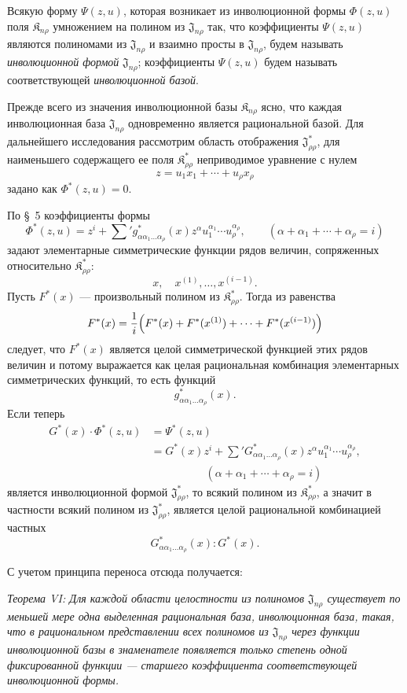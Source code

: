 \documentclass[11pt]{article}
\providecommand{\Kfield}{\mathfrak{K}}
\providecommand{\Jdom}{\mathfrak{J}}
\begin{document}
Всякую форму $\Psi(z,u)$, которая возникает из инволюционной формы $\Phi(z,u)$ поля $\Kfield_{n\rho}$ умножением на полином из $\Jdom_{n\rho}$ так, что коэффициенты $\Psi(z,u)$ являются полиномами из $\Jdom_{n\rho}$ и взаимно просты в $\Jdom_{n\rho}$, будем называть \emph{инволюционной формой} $\Jdom_{n\rho}$; коэффициенты $\Psi(z,u)$ будем называть соответствующей \emph{инволюционной базой}.

Прежде всего из значения инволюционной базы $\Kfield_{n\rho}$ ясно, что каждая инволюционная база $\Jdom_{n\rho}$ одновременно является рациональной базой. Для дальнейшего исследования рассмотрим область отображения $\Jdom^*_{\rho\rho}$, для наименьшего содержащего ее поля $\Kfield^*_{\rho\rho}$ неприводимое уравнение с нулем
\[
  z=u_1x_1+\cdots+u_\rho x_\rho
\]
задано как $\Phi^*(z,u)=0$.

По \S\ 5 коэффициенты формы
\[
  \Phi^*(z,u)=z^i+\sum{}' g^*_{\alpha\alpha_1\ldots\alpha_\rho}(x)
  z^\alpha u_1^{\alpha_1}\cdots u_\rho^{\alpha_\rho},
  \qquad
  (\alpha+\alpha_1+\cdots+\alpha_\rho=i)
\]
задают элементарные симметрические функции рядов величин, сопряженных относительно $\Kfield^*_{\rho\rho}$:
\[
  x,\quad x^{(1)},\ldots,x^{(i-1)}.
\]
Пусть $F^*(x)$ --- произвольный полином из $\Kfield^*_{\rho\rho}$. Тогда из равенства
\[
  F^*(x)=\frac1i\Bigl(F^*(x)+F^*(x^{(1)})+
  \cdots+F^*(x^{(i-1)})\Bigr)
\]
следует, что $F^*(x)$ является целой симметрической функцией этих рядов величин и потому выражается как целая рациональная комбинация элементарных симметрических функций, то есть функций
\[
  g^*_{\alpha\alpha_1\ldots\alpha_\rho}(x).
\]
Если теперь
\[
\begin{aligned}
  G^*(x)\cdot\Phi^*(z,u)
  &=\Psi^*(z,u)\\
  &=G^*(x)z^i+
    \sum{}'G^*_{\alpha\alpha_1\ldots\alpha_\rho}(x)
    z^\alpha u_1^{\alpha_1}\cdots u_\rho^{\alpha_\rho},\\
  &\hspace{5em}(\alpha+\alpha_1+\cdots+\alpha_\rho=i)
\end{aligned}
\]
является инволюционной формой $\Jdom^*_{\rho\rho}$, то всякий полином из $\Kfield^*_{\rho\rho}$, а значит в частности всякий полином из $\Jdom^*_{\rho\rho}$, является целой рациональной комбинацией частных
\[
  G^*_{\alpha\alpha_1\ldots\alpha_\rho}(x):G^*(x).
\]

С учетом принципа переноса отсюда получается:

\emph{Теорема VI: Для каждой области целостности из полиномов $\Jdom_{n\rho}$ существует по меньшей мере одна выделенная рациональная база, инволюционная база, такая, что в рациональном представлении всех полиномов из $\Jdom_{n\rho}$ через функции инволюционной базы в знаменателе появляется только степень одной фиксированной функции --- старшего коэффициента соответствующей инволюционной формы.}
\end{document}
